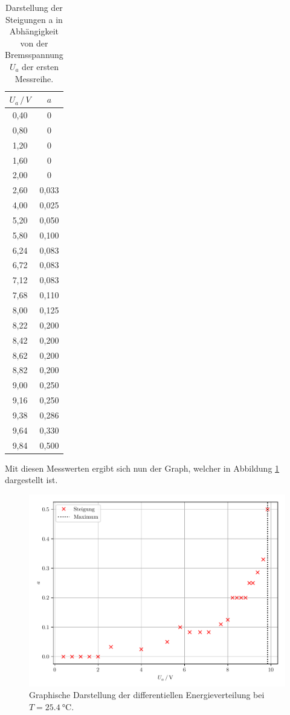 \begin{table}[H]
  \centering
  \caption{Darstellung der Steigungen a in Abhängigkeit von der Bremsspannung $U_a$
  der ersten Messreihe.}
  \label{tab:2}
  \begin{tabular}{c c}
    \toprule
    $U_a \, / \, V$ & $a$ \\
    \midrule
    0,40 & 0 \\
    0,80 & 0 \\
    1,20 & 0 \\
    1,60 & 0 \\
    2,00 & 0 \\
    2,60 & 0,033  \\
    4,00 & 0,025  \\
    5,20 & 0,050  \\
    5,80 & 0,100  \\
    6,24 & 0,083  \\
    6,72 & 0,083  \\
    7,12 & 0,083  \\
    7,68 & 0,110  \\
    8,00 & 0,125  \\
    8,22 & 0,200  \\
    8,42 & 0,200  \\
    8,62 & 0,200  \\
    8,82 & 0,200  \\
    9,00 & 0,250  \\
    9,16 & 0,250  \\
    9,38 & 0,286  \\
    9,64 & 0,330   \\
    9,84 & 0,500    \\
    \bottomrule
  \end{tabular}
\end{table}

Mit diesen Messwerten ergibt sich nun der Graph, welcher in Abbildung \ref{abb:3}
dargestellt ist.

\begin{figure}[H]
  \centering
  \includegraphics[width=\textwidth]{plot1.pdf}
  \caption{Graphische Darstellung der differentiellen Energieverteilung bei $T = \SI{25.4}{\celsius}$.}
  \label{abb:3}
\end{figure}

